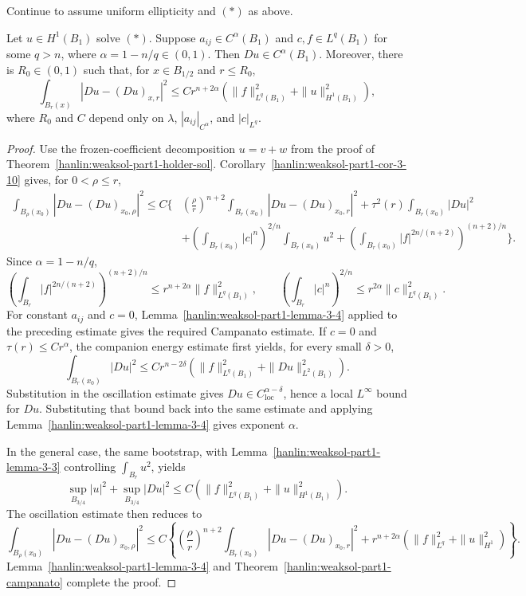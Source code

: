 Continue to assume uniform ellipticity and $(\ast)$ as above.

\begin{theorem}\label{hanlin:weaksol-part1-grad-holder}
Let $u\in H^1(B_1)$ solve $(\ast)$. Suppose
$a_{ij}\in C^\alpha(B_1)$ and $c,f\in L^q(B_1)$ for some $q>n$, where
$\alpha=1-n/q\in(0,1)$. Then $Du\in C^\alpha(B_1)$. Moreover, there is
$R_0\in(0,1)$ such that, for $x\in B_{1/2}$ and $r\leq R_0$,
\[
\int_{B_r(x)}|Du-(Du)_{x,r}|^2
\leq Cr^{n+2\alpha}
\left(\|f\|_{L^q(B_1)}^2+\|u\|_{H^1(B_1)}^2\right),
\]
where $R_0$ and $C$ depend only on $\lambda$,
$|a_{ij}|_{C^\alpha}$, and $|c|_{L^q}$.
\end{theorem}
\begin{proof}
\sketch Use the frozen-coefficient decomposition $u=v+w$ from the proof of
Theorem~\ref{hanlin:weaksol-part1-holder-sol}.
Corollary~\ref{hanlin:weaksol-part1-cor-3-10} gives, for
$0<\rho\leq r$,
\begin{equation}
\begin{aligned}
\int_{B_\rho(x_0)}|Du-(Du)_{x_0,\rho}|^2
\leq C\biggl\{&
\left(\frac\rho r\right)^{n+2}
\int_{B_r(x_0)}|Du-(Du)_{x_0,r}|^2
+\tau^2(r)\int_{B_r(x_0)}|Du|^2\\
&+\left(\int_{B_r(x_0)}|c|^n\right)^{2/n}
\int_{B_r(x_0)}u^2
+\left(\int_{B_r(x_0)}|f|^{2n/(n+2)}\right)^{(n+2)/n}
\biggr\}.
\end{aligned}
\end{equation}
Since $\alpha=1-n/q$,
\[
\left(\int_{B_r}|f|^{2n/(n+2)}\right)^{(n+2)/n}
\leq r^{n+2\alpha}\|f\|_{L^q(B_1)}^2,
\qquad
\left(\int_{B_r}|c|^n\right)^{2/n}
\leq r^{2\alpha}\|c\|_{L^q(B_1)}^2.
\]
For constant $a_{ij}$ and $c=0$,
Lemma~\ref{hanlin:weaksol-part1-lemma-3-4} applied to the preceding estimate
gives
the required Campanato estimate. If $c=0$ and
$\tau(r)\leq Cr^\alpha$, the companion energy estimate first yields, for
every small $\delta>0$,
\[
\int_{B_r(x_0)}|Du|^2
\leq Cr^{n-2\delta}
\left(\|f\|_{L^q(B_1)}^2+\|Du\|_{L^2(B_1)}^2\right).
\]
Substitution in the oscillation estimate gives
$Du\in C^{\alpha-\delta}_{\mathrm{loc}}$, hence a local $L^\infty$ bound
for $Du$. Substituting that bound back into the same estimate and
applying Lemma~\ref{hanlin:weaksol-part1-lemma-3-4} gives exponent $\alpha$.

In the general case, the same bootstrap, with
Lemma~\ref{hanlin:weaksol-part1-lemma-3-3} controlling
$\int_{B_r}u^2$, yields
\[
\sup_{B_{3/4}}|u|^2+\sup_{B_{3/4}}|Du|^2
\leq C\left(\|f\|_{L^q(B_1)}^2+\|u\|_{H^1(B_1)}^2\right).
\]
The oscillation estimate then reduces to
\[
\int_{B_\rho(x_0)}|Du-(Du)_{x_0,\rho}|^2
\leq C\left\{
\left(\frac\rho r\right)^{n+2}
\int_{B_r(x_0)}|Du-(Du)_{x_0,r}|^2
+r^{n+2\alpha}
\left(\|f\|_{L^q}^2+\|u\|_{H^1}^2\right)\right\}.
\]
Lemma~\ref{hanlin:weaksol-part1-lemma-3-4} and
Theorem~\ref{hanlin:weaksol-part1-campanato} complete the proof.
\end{proof}

